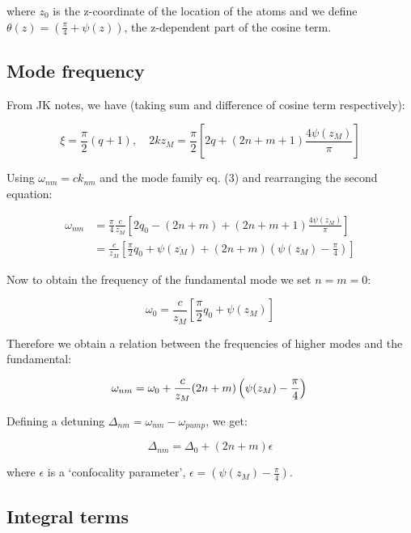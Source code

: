 \documentclass[a4paper,twocolumn,nobalancelastpage]{revtex4-1}
\begin{document}
where $z_0$ is the z-coordinate of the location of the atoms and we define $\theta(z)=\left(\frac{\pi}{4}+\psi(z)\right)$, the z-dependent part of the cosine term.  

\subsection{Mode frequency}

From JK notes, we have (taking sum and difference of cosine term respectively):

\begin{displaymath}
\xi=\frac{\pi}{2}(q+1), \quad 2kz_M=\frac{\pi}{2} \left[ 2q+(2n+m+1)\frac{4\psi(z_M)}{\pi}\right]
\end{displaymath}

Using $\omega_{nm}=c k_{nm}$ and the mode family eq. (3) and rearranging the second equation:

\begin{align}
\omega_{nm} & =\frac{\pi}{4} \frac{c}{z_M}
\left[ 2q_0-(2n+m)+(2n+m+1)\frac{4\psi(z_M)}{\pi}\right] \nonumber \\
 & = \frac{c}{z_M}
\left[  \frac{\pi}{2}q_0+\psi(z_M)+(2n+m)(\psi(z_M)-\frac{\pi}{4})\right] \nonumber
\end{align}

Now to obtain the frequency of the fundamental mode we set $n=m=0$:

\begin{equation}
\omega_0=\frac{c}{z_M} \left[ \frac{\pi}{2}q_0+\psi(z_M)\right]
\end{equation}

Therefore we obtain a relation between the frequencies of higher modes and the fundamental:

\begin{equation}
\omega_{nm}=\omega_0+ \frac{c}{z_M}
(2n+m)\left(\psi(z_M)-\frac{\pi}{4}\right) \nonumber \nonumber \\
\end{equation}

Defining a detuning $\Delta_{nm}=\omega_{nm}-\omega_{pump}$, we get:

\begin{equation}
\Delta_{nm}=\Delta_0+(2n+m)\epsilon
\end{equation}

where $\epsilon$ is a `confocality parameter', $\epsilon=\left(\psi(z_M)-\frac{\pi}{4}\right)$.

\subsection{Integral terms}
\end{document}
